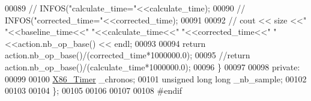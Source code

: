 \begin{DoxyCode}
00089 \textcolor{comment}{//     INFOS("calculate\_time="<<calculate\_time);}
00090 \textcolor{comment}{//     INFOS("corrected\_time="<<corrected\_time);}
00091 
00092 \textcolor{comment}{//    cout << size <<" "<<baseline\_time<<" "<<calculate\_time<<" "<<corrected\_time<<" "<<action.nb\_op\_base()
       << endl;}
00093 
00094     \textcolor{keywordflow}{return} action.nb\_op\_base()/(corrected\_time*1000000.0);
00095     \textcolor{comment}{//return action.nb\_op\_base()/(calculate\_time*1000000.0);}
00096   \}
00097 
00098 \textcolor{keyword}{private}:
00099 
00100   \hyperlink{class_x86___timer}{X86\_Timer} \_chronos;
00101   \textcolor{keywordtype}{unsigned} \textcolor{keywordtype}{long} \textcolor{keywordtype}{long} \_nb\_sample;
00102 
00103 
00104 \};
00105 
00106 
00107 
00108 \textcolor{preprocessor}{#endif}
\end{DoxyCode}
